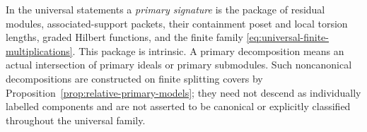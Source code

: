 \begin{definition}
In the universal statements a \emph{primary signature} is the package
of residual modules, associated-support packets, their containment
poset and local torsion lengths, graded Hilbert functions, and the
finite family \eqref{eq:universal-finite-multiplications}.  This
package is intrinsic.  A primary decomposition means an actual
intersection of primary ideals or primary submodules.  Such
noncanonical decompositions are constructed on finite splitting covers
by Proposition~\ref{prop:relative-primary-models}; they need not
descend as individually labelled components and are not asserted to
be canonical or explicitly classified throughout the universal family.
\end{definition}
